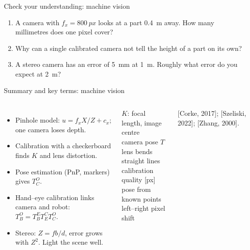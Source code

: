 \documentclass[aspectratio=169,10pt]{beamer}
\begin{document}
\begin{frame}{Check your understanding: machine vision}
\begin{keybox}
\large
\begin{enumerate}
\item A camera with $f_x=\SI{800}{px}$ looks at a part \SI{0.4}{m} away. How many millimetres does one pixel cover?
\item Why can a single calibrated camera not tell the height of a part on its own?
\item A stereo camera has an error of \SI{5}{mm} at \SI{1}{m}. Roughly what error do you expect at \SI{2}{m}?
\end{enumerate}
\end{keybox}
\end{frame}

\begin{frame}{Summary and key terms: machine vision}
\begin{columns}[T]
\begin{itemize}\small
\item Pinhole model: $u=f_xX/Z+c_x$; one camera loses depth.
\item Calibration with a checkerboard finds $K$ and lens distortion.
\item Pose estimation (PnP, markers) gives $T_C^O$.
\item Hand--eye calibration links camera and robot: $T_B^O=T_B^E T_E^C T_C^O$.
\item Stereo: $Z=fb/d$, error grows with $Z^2$. Light the scene well.
\end{itemize}
\begin{defbox}
\small
{} $K$: focal length, image centre\\
 camera pose $T$\\
 lens bends straight lines\\
 calibration quality [px]\\
 pose from known points\\
 left--right pixel shift
\end{defbox}
{\scriptsize\color{mkGray} [Corke, 2017]; [Szeliski, 2022]; [Zhang, 2000].}
\end{columns}
\end{frame}
\end{document}

